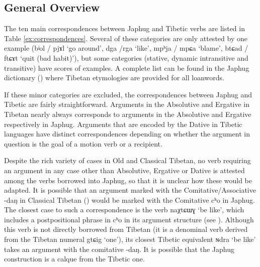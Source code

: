 \documentclass[oldfontcommands,oneside,a4paper,11pt]{article}
\newcommand{\ipa}[1]{{\phon \mbox{#1}}} %
\begin{document}
\subsection{General Overview}
The ten main correspondences between Japhug and Tibetic verbs are listed in Table \ref{ex:correspondences}. Several of these categories are only attested by one example (\ipa{bʲol} / \ipa{pjɤl} `go around', \ipa{dga} /\ipa{rga} `like', \ipa{mpʰja} / \ipa{mpɕa} `blame', \ipa{btɕad} / \ipa{ftɕɤt} `quit (bad habit)'), but some categories (stative, dynamic intransitive and transitive) have scores of examples. A complete list can be found in the Japhug dictionary (\citealt{jacques15japhug}) where Tibetan etymologies are provided for all loanwords.

If these minor categories are excluded, the correspondences between Japhug and Tibetic are fairly straightforward. Arguments in the Absolutive and Ergative in Tibetan nearly always corresponds to arguments in the Absolutive and Ergative respectively in Japhug. Arguments that are encoded by the Dative in Tibetic languages have distinct correspondences depending on whether the argument in question is the goal of a motion verb or a recipient.

Despite the rich variety of cases in Old and Classical Tibetan, no verb requiring an argument in any case other than Absolutive, Ergative or Dative is attested among the verbs borrowed into Japhug, so that it is unclear how these would be adapted. It is possible that an argument marked with the Comitative/Associative \ipa{-daŋ} in Classical Tibetan (\citealt{tournadre10cases, hill12bas}) would be marked with the Comitative \ipa{cʰo} in Japhug. The closest case to such a correspondence is the verb \ipa{naχtɕɯɣ} `be like', which includes a postpositional phrase in \ipa{cʰo} in its argument structure (see \citealt[273]{jacques14linking}). Although this verb is not directly borrowed from Tibetan (it is a denominal verb derived from the Tibetan numeral \ipa{gtɕig} `one'), its closest Tibetic equivalent \ipa{ɴdra} `be like' takes an argument with the comitative \ipa{-daŋ}. It is possible that the Japhug construction is a calque from the Tibetic one.
\end{document}
